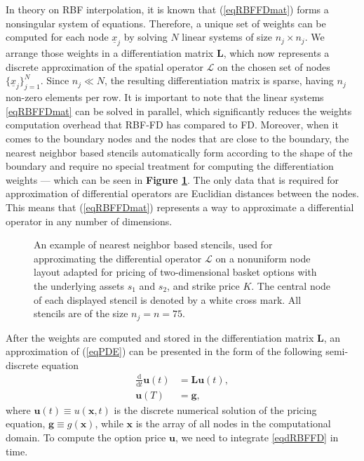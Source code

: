 \documentclass{UUThesisTemplate}
\begin{document}
In theory on RBF interpolation, it is known that (\ref{eqRBFFDmat}) forms a nonsingular system of equations. Therefore, a unique set of weights can be computed for each node $\underline{x}_j$ by solving $N$ linear systems of size $n_j\times n_j$. We arrange those weights in a differentiation matrix $\mathbf{L}$, which now represents a discrete approximation of the spatial operator $\mathcal{L}$ on the chosen set of nodes $\{\underline{x}_j\}_{j=1}^N$. Since $n_j \ll N$, the resulting differentiation matrix is sparse, having $n_j$ non-zero elements per row. It is important to note that the linear systems \eqref{eqRBFFDmat} can be solved in parallel, which significantly reduces the weights computation overhead that RBF-FD has compared to FD. Moreover, when it comes to the boundary nodes and the nodes that are close to the boundary, the nearest neighbor based stencils automatically form according to the shape of the boundary and require no special treatment for computing the differentiation weights --- which can be seen in \textbf{Figure \ref{fig:gridsten}}. The only data that is required for approximation of differential operators are Euclidian distances between the nodes. This means that (\ref{eqRBFFDmat}) represents a way to approximate a differential operator in any number of dimensions.

\begin{figure}[H]
\centering

\caption{An example of nearest neighbor based stencils, used for approximating the differential operator $\mathcal{L}$ on a nonuniform node layout adapted for pricing of two-dimensional basket options with the underlying assets $s_1$ and $s_2$, and strike price $K$. The central node of each displayed stencil is denoted by a white cross mark. All stencils are of the size $n_j=n=75$.}
\label{fig:gridsten}
\end{figure}

\par
After the weights are computed and stored in the differentiation matrix $\mathbf{L}$, an approximation of (\ref{eqPDE}) can be presented in the form of the following semi-discrete equation
\begin{align}
\label{eqdRBFFD}
\frac{\mathrm{d}}{\mathrm{d} t}\mathbf{u}(t)&=\mathbf{L}\mathbf{u}(t),\\
\mathbf{u}(T)&=\mathbf{g},
\end{align}
where $\mathbf{u}(t)\equiv u(\mathbf{x},t)$ is the discrete numerical solution of the pricing equation, $\mathbf{g}\equiv g(\mathbf{x})$, while $\mathbf{x}$ is the array of all nodes in the computational domain. To compute the option price $\mathbf{u}$, we need to integrate \eqref{eqdRBFFD} in time. 
\end{document}
